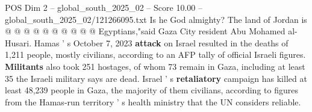 \begin{textsample}{POS Dim 2 – global\_south\_2025\_02 – Score 10.00 – global\_south\_2025\_02/121266095.txt}
Is he God almighty?
The land of Jordan is @ @ @ @ @ @ @ @ @ @ Egyptians,"said Gaza City resident Abu Mohamed al-Husari.
Hamas ' s October 7, 2023 \textbf{attack} on Israel resulted in the deaths of 1,211 people, mostly civilians, according to an AFP tally of official Israeli figures. \textbf{Militants} also took 251 hostages, of whom 73 remain in Gaza, including at least 35 the Israeli military says are dead.
Israel ' s \textbf{retaliatory} campaign has killed at least 48,239 people in Gaza, the majority of them civilians, according to figures from the Hamas-run territory ' s health ministry that the UN considers reliable.

\end{textsample}
